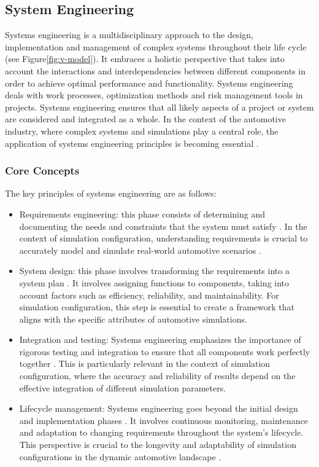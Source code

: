 \subsection{System Engineering \label{sec:sysen}}
Systems engineering is a multidisciplinary approach to the design, implementation and management of complex systems throughout their life cycle \cite{haberfellner2019systems} (see Figure\ref{fig:v-model}). It embraces a holistic perspective that takes into account the interactions and interdependencies between different components in order to achieve optimal performance and functionality. Systems engineering deals with work processes, optimization methods and risk management tools in projects. Systems engineering ensures that all likely aspects of a project or system are considered and integrated as a whole. In the context of the automotive industry, where complex systems and simulations play a central role, the application of systems engineering principles is becoming essential \cite{d2017systems}.

\subsubsection{Core Concepts}
    The key principles of systems engineering are as follows:
    \begin{itemize}
      \item Requirements engineering: this phase consists of determining and documenting the needs and constraints that the system must satisfy \cite{loper2015modeling}. In the context of simulation configuration, understanding requirements is crucial to accurately model and simulate real-world automotive scenarios \cite{keating2008system}.
      
      \item System design: this phase involves transforming the requirements into a system plan \cite{loper2015modeling, nielsen2015systems}. It involves assigning functions to components, taking into account factors such as efficiency, reliability, and maintainability. For simulation configuration, this step is essential to create a framework that aligns with the specific attributes of automotive simulations.
      
      \item Integration and testing: Systems engineering emphasizes the importance of rigorous testing and integration to ensure that all components work perfectly together \cite{loper2015modeling}. This is particularly relevant in the context of simulation configuration, where the accuracy and reliability of results depend on the effective integration of different simulation parameters.
      
      \item Lifecycle management: Systems engineering goes beyond the initial design and implementation phases \cite{loper2015modeling}. It involves continuous monitoring, maintenance and adaptation to changing requirements throughout the system's lifecycle. This perspective is crucial to the longevity and adaptability of simulation configurations in the dynamic automotive landscape \cite{nielsen2015systems}.
    \end{itemize}

